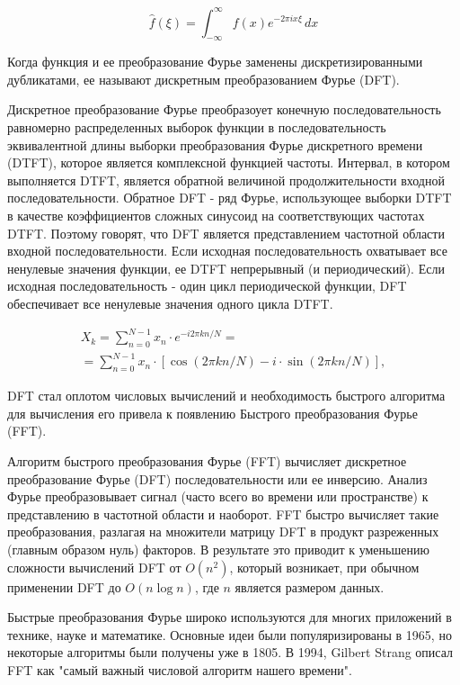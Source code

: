 \documentclass[14pt]{article}
\numberwithin{figure}{section}
\numberwithin{equation}{section}
\begin{document}
$$\hat{f}(\xi) =\int_{-\infty}^{\infty}f(x)e^{-2\pi ix\xi }\,dx$$

Когда функция и ее преобразование Фурье заменены дискретизированными дубликатами, ее называют дискретным преобразованием Фурье (DFT). 

Дискретное преобразование Фурье преобразоует конечную последовательность равномерно распределенных выборок функции в последовательность эквивалентной длины выборки преобразования Фурье дискретного времени (DTFT), которое является комплексной функцией частоты. Интервал, в котором выполняется DTFT, является обратной величиной продолжительности входной последовательности. Обратное DFT - ряд Фурье, использующее выборки DTFT в качестве коэффициентов сложных синусоид на соответствующих частотах DTFT. Поэтому говорят, что DFT является представлением частотной области входной последовательности. Если исходная последовательность охватывает все ненулевые значения функции, ее DTFT непрерывный (и периодический). Если исходная последовательность - один цикл периодической функции, DFT обеспечивает все ненулевые значения одного цикла DTFT.

\begin{eqnarray}
X_{k}=\sum _{n=0}^{N-1}x_{n}\cdot e^{-i2\pi kn/N}= \nonumber \\
=\sum _{n=0}^{N-1}x_{n}\cdot [\cos(2\pi kn/N)-i\cdot \sin(2\pi kn/N)]\nonumber,
\end{eqnarray}


DFT стал оплотом числовых вычислений и необходимость быстрого алгоритма для вычисления его привела к появлению Быстрого преобразования Фурье (FFT).

Алгоритм быстрого преобразования Фурье (FFT) вычисляет дискретное преобразование Фурье (DFT) последовательности или ее инверсию. Анализ Фурье преобразовывает сигнал (часто всего во времени или пространстве) к представлению в частотной области и наоборот. FFT быстро вычисляет такие преобразования, разлагая на множители матрицу DFT в продукт разреженных (главным образом нуль) факторов. В результате это приводит к уменьшению сложности вычислений DFT от $ O (n^ {2})$, который возникает, при обычном применении DFT до $O (n\log n)$, где $ n $  является размером данных.

Быстрые преобразования Фурье широко используются для многих приложений в технике, науке и математике. Основные идеи были популяризированы в 1965, но некоторые алгоритмы были получены уже в 1805. В 1994, Gilbert Strang описал FFT как "самый важный числовой алгоритм нашего времени".
\end{document}
